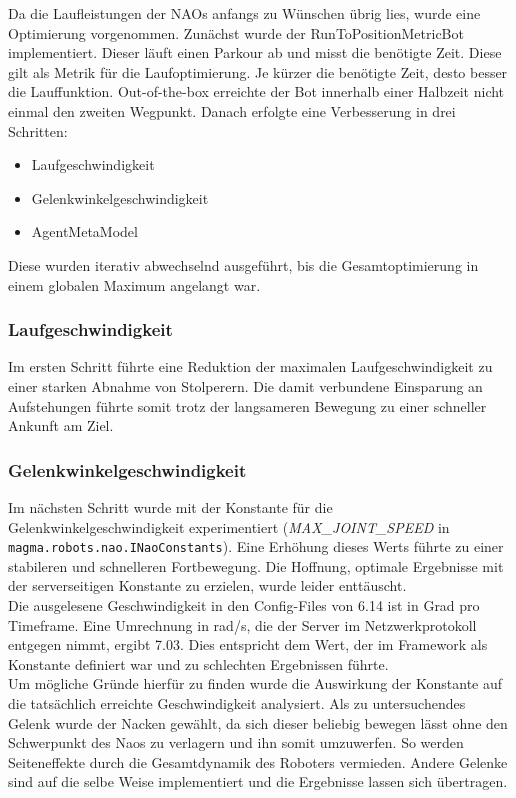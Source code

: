 Da die Laufleistungen der NAOs anfangs zu Wünschen übrig lies, wurde eine Optimierung vorgenommen. Zunächst wurde der RunToPositionMetricBot implementiert. Dieser läuft einen Parkour ab und misst die benötigte Zeit. Diese gilt als Metrik für die Laufoptimierung. Je kürzer die benötigte Zeit, desto besser die Lauffunktion.
Out-of-the-box erreichte der Bot innerhalb einer Halbzeit nicht einmal den zweiten Wegpunkt.
Danach erfolgte eine Verbesserung in drei Schritten:
\begin{itemize}
\item Laufgeschwindigkeit
\item Gelenkwinkelgeschwindigkeit
\item AgentMetaModel
\end{itemize}
Diese wurden iterativ abwechselnd ausgeführt, bis die Gesamtoptimierung in einem globalen Maximum angelangt war.

\subsubsection{Laufgeschwindigkeit}
Im ersten Schritt führte eine Reduktion der maximalen Laufgeschwindigkeit zu einer starken Abnahme von Stolperern. Die damit verbundene Einsparung an Aufstehungen führte somit trotz der langsameren Bewegung zu einer schneller Ankunft am Ziel.

\subsubsection{Gelenkwinkelgeschwindigkeit}
\label{subsubsec:joint-speed}
Im nächsten Schritt wurde mit der Konstante für die Gelenkwinkelgeschwindigkeit experimentiert (\textit{MAX\_JOINT\_SPEED} in  \texttt{magma.robots.nao.INaoConstants}). Eine Erhöhung dieses Werts führte zu einer stabileren und schnelleren Fortbewegung. Die Hoffnung, optimale Ergebnisse mit der serverseitigen Konstante zu erzielen, wurde leider enttäuscht.\\
Die ausgelesene Geschwindigkeit in den Config-Files von 6.14 ist in Grad pro Timeframe. Eine Umrechnung in rad/s, die der Server im Netzwerkprotokoll entgegen nimmt, ergibt 7.03. Dies entspricht dem Wert, der im Framework als Konstante definiert war und zu schlechten Ergebnissen führte.\\

Um mögliche Gründe hierfür zu finden wurde die Auswirkung der Konstante auf die tatsächlich erreichte Geschwindigkeit analysiert.
Als zu untersuchendes Gelenk wurde der Nacken gewählt, da sich dieser beliebig bewegen lässt ohne den Schwerpunkt des Naos zu verlagern und ihn somit umzuwerfen. So werden Seiteneffekte durch die Gesamtdynamik des Roboters vermieden. Andere Gelenke sind auf die selbe Weise implementiert und die Ergebnisse lassen sich übertragen.

